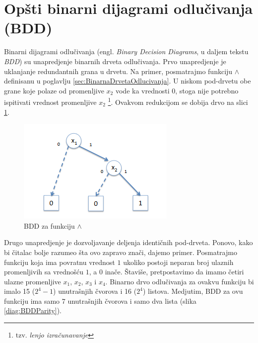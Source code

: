 \section{Op\v{s}ti binarni dijagrami odlu\v{c}ivanja (BDD)}
\label{sec:BDD}

Binarni dijagrami odlu\v{c}ivanja (engl. \emph{Binary Decision Diagrams}, u daljem tekstu \emph{BDD}) \cite{BDD} su unapredjenje binarnih drveta odlu\v{c}ivanja. Prvo unapredjenje je uklanjanje redundantnih grana u drvetu. Na primer, posmatrajmo funkciju $\wedge$ definisanu u poglavlju \ref{sec:BinarnaDrvetaOdlucivanja}. U niskom pod-drvetu obe grane koje polaze od promenljive $x_{2}$ vode ka vrednosti $0$, stoga nije potrebno ispitivati vrednost promenljive $x_{2}$ \footnote{tzv. \emph{lenjo izra\v{c}unavanje}}. Ovakvom redukcijom se dobija drvo na slici \ref{diag:BDDAnd}.

\begin{figure}[H]
    \centering
    \includegraphics[scale=0.8]{slike/BDD_And.PNG}
    \caption{BDD za funkciju $\wedge$}
    \label{diag:BDDAnd}
\end{figure}

Drugo unapredjenje je dozvoljavanje deljenja identi\v{c}nih pod-drveta. Ponovo, kako bi \v{c}italac bolje razumeo \v{s}ta ovo zapravo zna\v{c}i, dajemo primer. Posmatrajmo funkciju koja ima povratnu vrednost $1$ ukoliko postoji neparan broj ulaznih promenljivih sa vredno\v{s}\'c{}u $1$, a $0$ ina\v{c}e. \v{S}tavi\v{s}e, pretpostavimo da imamo \v{c}etiri ulazne promenljive $x_{1}$, $x_{2}$, $x_{3}$ i $x_{4}$. Binarno drvo odlu\v{c}ivanja za ovakvu funkciju bi imalo 15 ($2^4 - 1$) unutra\v{s}njih \v{c}vorova i 16 ($2^4$) listova. Medjutim, BDD za ovu funkciju ima samo 7 unutra\v{s}njih \v{c}vorova i samo dva lista (slika \ref{diag:BDDParity}).

